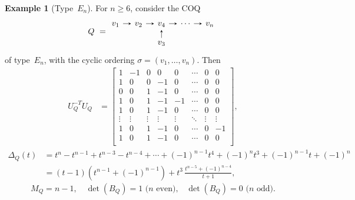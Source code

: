 \documentclass[11pt, letterpaper]{amsart}
\theoremstyle{definition}
\newtheorem{example}[theorem]{Example}
\numberwithin{equation}{section}
\begin{document}
\begin{example}[Type~$E_n$]
\label{eg:En-Alexander}
For $n\ge6$, consider the COQ 
\begin{equation*}
Q\ =\begin{tikzcd}[arrows={-stealth}, sep=1em]
  v_1  \arrow[r]   & v_2  \arrow[r] & v_4 \arrow[r] & \cdots \arrow[r] & v_n \\
 & & v_3  \arrow[u] 
   & 
\end{tikzcd}
\end{equation*}
of type~$E_n$, with the cyclic ordering $\sigma=(v_1,\dots,v_n)$.
Then
\begin{align*}
U_Q^{-T}U_Q&= \begin{bmatrix} 
1 &  -1 & 0 & 0 & 0 & \cdots & 0 & 0 \\ 
1 &  0 & 0 & -1 & 0 & \cdots & 0 & 0 \\ 
0 &  0 & 1  &-1 & 0 & \cdots & 0 & 0 \\
1 &  0 & 1  &-1 & -1 & \cdots & 0 & 0 \\
1 &  0 & 1  &-1 & 0 & \cdots & 0 & 0 \\
\vdots & \vdots & \vdots & \vdots & \vdots & \ddots & \vdots & \vdots \\
1 &  0 & 1 & -1  & 0 & \cdots & 0 & -1 \\
1 &  0 & 1 & -1  & 0 & \cdots & 0 & 0 \\
\end{bmatrix}\!, 
\end{align*}
\begin{align*}
\Delta_Q(t)&=t^n-t^{n-1}
+t^{n-3}-t^{n-4}+\cdots+(-1)^{n-1} t^4+(-1)^n t^3
+(-1)^{n-1}t+(-1)^n \\
&=(t-1)(t^{n-1}+(-1)^{n-1})+t^3 \,\frac{t^{n-5}+(-1)^{n-4}}{t+1}, 
\end{align*}
\begin{equation*}
M_Q=n-1, \quad  \det(B_Q)=1 \text{ ($n$ even),}  \quad  \det(B_Q)=0 \text{ ($n$ odd)}. 
\end{equation*}
\end{example}
\end{document}
